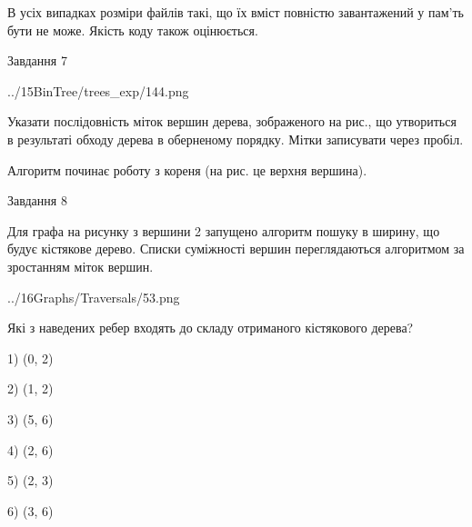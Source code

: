 \documentclass[12pt, ukrainian]{article}
\begin{document}
{В усіх випадках розміри файлів такі, що їх вміст повністю завантажений у пам'ть бути не може. Якість коду також оцінюється.



\vspace{10mm}\par

\newpage
\begin{minipage}[t]{9.7cm}
               
{\begin{center}Завдання {7}\end{center}}
\vspace{-4mm}

\begin{center}
	{../15BinTree/trees_exp/144.png}
\end{center}
Указати послідовність міток вершин дерева, зображеного на рис., що утвориться в результаті обходу дерева в оберненому порядку. Мітки записувати через пробіл.\par Алгоритм починає роботу з кореня (на рис. це верхня вершина).\par

\end{minipage}
\vline \hspace{8mm}
\begin{minipage}[t]{8.0cm}
               
{\begin{center}Завдання {8}\end{center}}
\vspace{-4mm}
Для графа на рисунку з вершини 2 запущено алгоритм пошуку в ширину, що будує кістякове дерево. Списки суміжності вершин переглядаються алгоритмом за зростанням міток вершин.\par
\begin{center}
	{../16Graphs/Traversals/53.png}
\end{center}
\par Які з наведених ребер входять до складу отриманого кістякового дерева?\par
1) (0, 2)\par
2) (1, 2)\par
3) (5, 6)\par
4) (2, 6)\par
5) (2, 3)\par
6) (3, 6)\par
{\vskip 15pt} \par


\end{minipage}}
\end{document}
